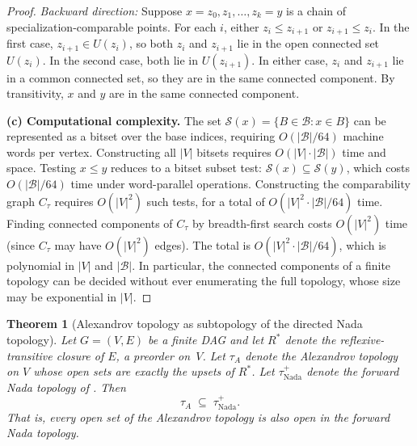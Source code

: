 \documentclass[11pt,a4paper]{article}
\theoremstyle{plain}
\newtheorem{theorem}{Theorem}[section]
\theoremstyle{definition}
\newcommand{\taufwd}{\tau^{+}}
\newcommand{\base}{\mathcal{B}}
\begin{document}
\begin{proof}
\emph{Backward direction:} Suppose $x = z_0, z_1, \ldots, z_k = y$ is a chain
of specialization-comparable points.  For each $i$, either $z_i \leq z_{i+1}$
or $z_{i+1} \leq z_i$.  In the first case, $z_{i+1} \in U(z_i)$, so both
$z_i$ and $z_{i+1}$ lie in the open connected set $U(z_i)$.  In the second
case, both lie in $U(z_{i+1})$.  In either case, $z_i$ and $z_{i+1}$ lie
in a common connected set, so they are in the same connected component.
By transitivity, $x$ and $y$ are in the same connected component.

\medskip
\noindent
\textbf{(c) Computational complexity.}
The set $\mathcal{S}(x) = \{B \in \base : x \in B\}$ can be represented as a
bitset over the base indices, requiring $O(|\base|/64)$ machine words per
vertex.  Constructing all $|V|$ bitsets requires $O(|V| \cdot |\base|)$
time and space.  Testing $x \leq y$ reduces to a bitset subset test:
$\mathcal{S}(x) \subseteq \mathcal{S}(y)$, which costs $O(|\base|/64)$ time
under word-parallel operations.  Constructing the comparability graph
$C_\tau$ requires $O(|V|^2)$ such tests, for a total of
$O(|V|^2 \cdot |\base|/64)$ time.  Finding connected components of $C_\tau$
by breadth-first search costs $O(|V|^2)$ time (since $C_\tau$ may have
$O(|V|^2)$ edges).  The total is $O(|V|^2 \cdot |\base|/64)$, which is
polynomial in $|V|$ and $|\base|$.  In particular, the connected components
of a finite topology can be decided without ever enumerating the full topology,
whose size may be exponential in $|V|$.
\end{proof}


\begin{theorem}[Alexandrov topology as subtopology of the directed Nada topology]%
\label{thm:alexandrov-subtopology}
Let $G = (V, E)$ be a finite DAG and let $R^*$ denote the
reflexive-transitive closure of $E$, a preorder on~$V$.  Let $\tau_A$ denote
the Alexandrov topology on $V$ whose open sets are exactly the upsets of
$R^*$.  Let $\taufwd_{\mathrm{Nada}}$ denote the forward Nada topology of
.  Then
\[
  \tau_A \;\subseteq\; \taufwd_{\mathrm{Nada}}.
\]
That is, every open set of the Alexandrov topology is also open in the
forward Nada topology.
\end{theorem}
\end{document}
